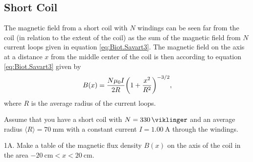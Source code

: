 \documentclass[../Elmag-labhefte-2020.tex]{subfiles}
\begin{document}
\subsection{Short Coil}

The magnetic field from a short coil with $N$ windings can be seen far from the coil (in relation to the extent of the coil) as the sum of the magnetic field from $N$ current loops given in equation \eqref{eq:Biot.Savart3}. The magnetic field on the axis at a distance $x$ from the middle center of the coil is then according to equation \eqref{eq:Biot.Savart3} given by
%
\begin{equation}
    B(x) = \frac{N\mu_0 I}{2 R} \qty(1 + \frac{x^{2}}{R^{2}})^{-3/2},
    \label{eq:kort.spole}
\end{equation}
%
where $R$ is the average radius of the current loops.

Assume that you have a short coil with $N = \SI{330}{\viklinger}$ and an average radius $\langle R \rangle  = \SI{70}{\mm}$ with a constant current $I = \SI{1,00}{\ampere}$ through the windings.

{\itsf 1A. Make a table of the magnetic flux density $B(x)$ on the axis of the coil in the area $-\SI{20}{\cm} < x < \SI{20}{\cm}$.}
\end{document}
